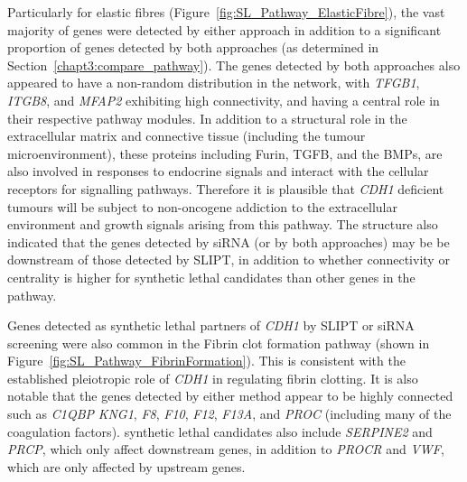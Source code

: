Particularly for elastic fibres (Figure~\ref{fig:SL_Pathway_ElasticFibre}), the vast majority of genes were detected by either approach in addition to a significant proportion of genes detected by both approaches (as determined in Section~\ref{chapt3:compare_pathway}). The genes detected by both approaches also appeared to have a non-random distribution in the network, with \textit{TFGB1}, \textit{ITGB8}, and \textit{MFAP2} exhibiting high connectivity, and having a central role in their respective \gls{pathway} modules. In addition to a structural role in the extracellular matrix and connective tissue (including the tumour microenvironment), these proteins including Furin, \gls{TGFB}, and the \glspl{BMP}, are also involved in responses to endocrine signals and interact with the cellular receptors for signalling \glspl{pathway}. Therefore it is plausible that \textit{CDH1} deficient tumours will be subject to \gls{non-oncogene addiction} to the extracellular environment and growth signals arising from this \gls{pathway}. The  structure also indicated that the genes detected by \gls{siRNA} (or by both approaches) may be be downstream of those detected by \gls{SLIPT}, in addition to whether connectivity or \gls{centrality} is higher for \gls{synthetic lethal} candidates than other genes in the \gls{pathway}.

Genes detected as \gls{synthetic lethal} partners of \textit{CDH1} by \gls{SLIPT} or \gls{siRNA} screening were also common in the Fibrin clot formation \gls{pathway} (shown in Figure~\ref{fig:SL_Pathway_FibrinFormation}). This is consistent with the established pleiotropic role of \textit{CDH1} in regulating fibrin clotting. It is also notable that the genes detected by either method appear to be highly connected such as \textit{C1QBP} \textit{KNG1}, \textit{F8}, \textit{F10}, \textit{F12}, \textit{F13A}, and \textit{PROC} (including many of the coagulation factors). \Gls{synthetic lethal} candidates also include \textit{SERPINE2} and \textit{PRCP}, which only affect downstream genes, in addition to \textit{PROCR} and \textit{VWF}, which are only affected by upstream genes. 

\begin{figure*}[!tb]
  \begin{center}
   }
   \end{center}
   \caption[Synthetic lethality in Fibrin Clot Formation]{\small \textbf{Synthetic lethality in Fibrin Clot Formation.} The Reactome Fibrin Clot Formation \gls{pathway} with \gls{synthetic lethal} candidates coloured as shown in the legend.
}
\label{fig:SL_Pathway_FibrinFormation}
\end{figure*}


